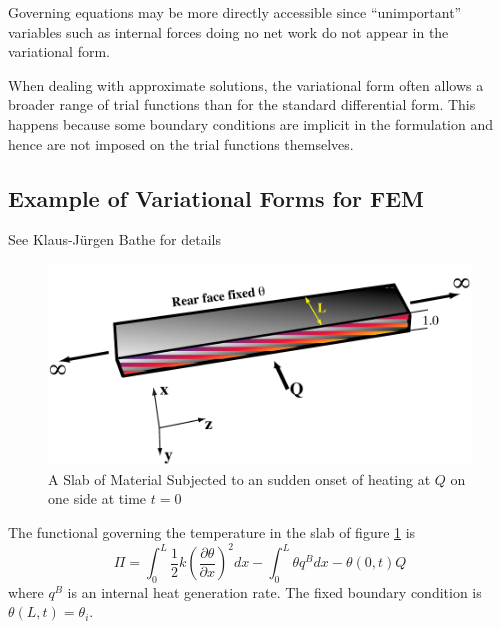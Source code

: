 \documentclass[10pt]{article}
\newcommand{\Emerald }[1]{\textcolor[rgb]{0.0,0.7,0.3}{ #1}}
\begin{document}
		Governing equations may be more directly accessible since
		``unimportant'' variables such as internal forces doing no
		net work do not appear in the variational form.
		
		When dealing with approximate solutions, the variational form
		often allows a broader range of trial functions than for the 
		standard differential form. This happens because some boundary
		conditions are implicit in the formulation and hence are not imposed
		on the trial functions themselves.
		
		
	
		\subsection{Example of Variational Forms for FEM}
	
		\Emerald{See Klaus-J\"{u}rgen Bathe for details}
	
		
			\begin{figure}[h]           
				\begin{center}
		 			 \includegraphics[width=0.66\linewidth]{Diagrams/heatcond.pdf}
		 			\caption[]{A Slab of Material Subjected to an sudden onset of heating at $Q$ on one side 
		 			at time $t=0$}
		 			\label{fig:heat1}
		 		\end{center}
			\end{figure}
	
		The functional governing the temperature in the slab of figure \ref{fig:heat1} is
			\begin{equation}
				\Pi = \int_0^L \frac{1}{2} k \left(\frac{\partial \theta}{\partial x} \right)^2 dx -  
								\int_0^L \theta q^B dx - \theta(0,t) Q
			\end{equation}
		where $q^B$ is an internal heat generation rate. The fixed boundary
		condition is $\theta(L,t) =\theta_i$.
		
\end{document}
